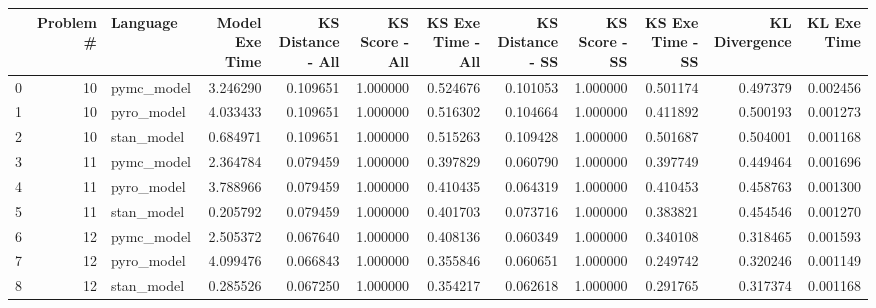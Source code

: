 \begin{tabular}{lrlrrrrrrrrr}
\toprule
 & Problem # & Language & Model Exe Time & KS Distance - All & KS Score - All & KS Exe Time - All & KS Distance - SS & KS Score - SS & KS Exe Time - SS & KL Divergence & KL Exe Time \\
\midrule
0 & 10 & pymc_model & 3.246290 & 0.109651 & 1.000000 & 0.524676 & 0.101053 & 1.000000 & 0.501174 & 0.497379 & 0.002456 \\
1 & 10 & pyro_model & 4.033433 & 0.109651 & 1.000000 & 0.516302 & 0.104664 & 1.000000 & 0.411892 & 0.500193 & 0.001273 \\
2 & 10 & stan_model & 0.684971 & 0.109651 & 1.000000 & 0.515263 & 0.109428 & 1.000000 & 0.501687 & 0.504001 & 0.001168 \\
3 & 11 & pymc_model & 2.364784 & 0.079459 & 1.000000 & 0.397829 & 0.060790 & 1.000000 & 0.397749 & 0.449464 & 0.001696 \\
4 & 11 & pyro_model & 3.788966 & 0.079459 & 1.000000 & 0.410435 & 0.064319 & 1.000000 & 0.410453 & 0.458763 & 0.001300 \\
5 & 11 & stan_model & 0.205792 & 0.079459 & 1.000000 & 0.401703 & 0.073716 & 1.000000 & 0.383821 & 0.454546 & 0.001270 \\
6 & 12 & pymc_model & 2.505372 & 0.067640 & 1.000000 & 0.408136 & 0.060349 & 1.000000 & 0.340108 & 0.318465 & 0.001593 \\
7 & 12 & pyro_model & 4.099476 & 0.066843 & 1.000000 & 0.355846 & 0.060651 & 1.000000 & 0.249742 & 0.320246 & 0.001149 \\
8 & 12 & stan_model & 0.285526 & 0.067250 & 1.000000 & 0.354217 & 0.062618 & 1.000000 & 0.291765 & 0.317374 & 0.001168 \\
\bottomrule
\end{tabular}
